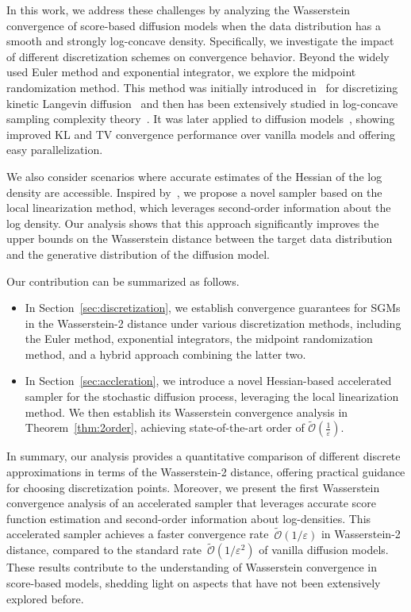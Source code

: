 \documentclass[11pt]{article}
\begin{document}
In this work, we address these challenges by analyzing the Wasserstein convergence of score-based diffusion models when the data distribution has a smooth and strongly log-concave density.
Specifically, we investigate the impact of different discretization schemes on convergence behavior. 
Beyond the widely used Euler method and exponential integrator, we explore the midpoint randomization method.
This method was initially introduced in~\cite{shen2019randomized} for discretizing kinetic Langevin diffusion~\cite{cheng2018underdamped} and then has been extensively studied in log-concave sampling complexity theory~\cite{he2020ergodicity,yu2023langevin,yu2024parallelized,yu2024log,kandasamy2024poisson}.
It was later applied to diffusion models~\cite{gupta2024faster,li2024improved}, showing improved KL and TV convergence performance over vanilla models and offering easy parallelization.

We also consider scenarios where accurate estimates of the Hessian of the log density are accessible. Inspired by~\cite{Shoji1998}, we propose a novel sampler based on the local linearization method, which leverages second-order information about the log density. Our analysis shows that this approach significantly improves the upper bounds on the Wasserstein distance between the target data distribution and the generative distribution of the diffusion model.

Our contribution can be summarized as follows.
\begin{itemize}
\setlength\itemsep{0.02em}
    \item In Section~\ref{sec:discretization}, we establish convergence guarantees for SGMs in the Wasserstein-2 distance under various discretization methods, including the Euler method, exponential integrators, the midpoint randomization method, and a hybrid approach combining the latter two. 
    \item In Section~\ref{sec:accleration}, we introduce a novel Hessian-based accelerated sampler for the stochastic diffusion process, leveraging the local linearization method. 
    We then establish its Wasserstein convergence analysis in Theorem~\ref{thm:2order}, achieving state-of-the-art order of
$\widetilde{\mathcal{O}}\left(\frac{1}{\varepsilon}\right)$.
\end{itemize}
In summary, our analysis provides a quantitative comparison of different discrete approximations in terms of the Wasserstein-2 distance, offering practical guidance for choosing discretization points.
Moreover, we present the first Wasserstein convergence analysis of an accelerated sampler that leverages accurate score function estimation and second-order information about log-densities.
This accelerated sampler achieves a faster convergence rate~$\widetilde{\mathcal{O}}\left(1/{\varepsilon}\right)$ in Wasserstein-2 distance, compared to the standard rate~$\widetilde{\mathcal{O}}\left(1/{\varepsilon^2}\right)$ of vanilla diffusion models. 
These results contribute to the understanding of Wasserstein convergence in score-based models, shedding light on aspects that have not been extensively explored before.
\end{document}
